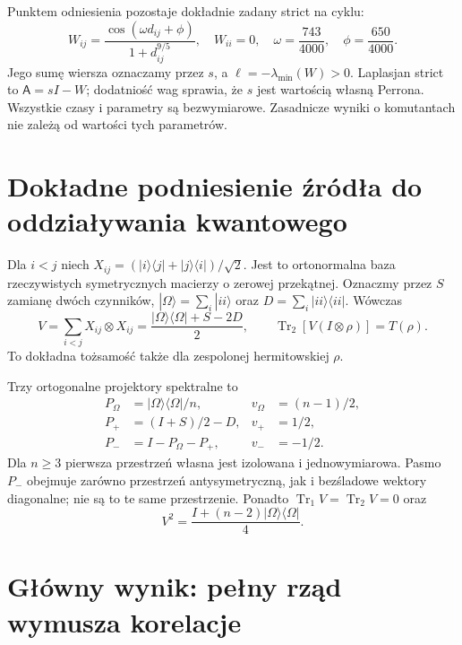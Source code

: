 \documentclass[11pt,a4paper]{article}
\newcommand{\Tr}{\operatorname{Tr}}
\begin{document}
Punktem odniesienia pozostaje dokładnie zadany strict na cyklu:
\begin{equation}\label{eq:strict}
 W_{ij}=\frac{\cos(\omega d_{ij}+\phi)}{1+d_{ij}^{9/5}},\quad
 W_{ii}=0,\quad \omega=\frac{743}{4000},\quad\phi=\frac{650}{4000}.
\end{equation}
Jego sumę wiersza oznaczamy przez $s$, a $\ell=-\lambda_{\min}(W)>0$.
Laplasjan strict to $\mathsf A=sI-W$; dodatniość wag sprawia, że
$s$ jest wartością własną Perrona.
Wszystkie czasy i parametry są bezwymiarowe. Zasadnicze wyniki
o komutantach nie zależą od wartości tych parametrów.

\section{Dokładne podniesienie źródła do oddziaływania kwantowego}

Dla $i<j$ niech $X_{ij}=(|i\rangle\langle j|+|j\rangle\langle i|)/\sqrt2$.
Jest to ortonormalna baza rzeczywistych symetrycznych macierzy
o zerowej przekątnej. Oznaczmy przez $S$ zamianę dwóch czynników,
$|\Omega\rangle=\sum_i|ii\rangle$ oraz $D=\sum_i|ii\rangle\langle ii|$.
Wówczas
\begin{equation}\label{eq:V}
 V=\sum_{i<j}X_{ij}\otimes X_{ij}
   =\frac{|\Omega\rangle\langle\Omega|+S-2D}{2},\qquad
 \Tr_2[V(I\otimes\rho)]=T(\rho).
\end{equation}
To dokładna tożsamość także dla zespolonej hermitowskiej $\rho$.

Trzy ortogonalne projektory spektralne to
\begin{align}
 P_\Omega&=|\Omega\rangle\langle\Omega|/n,&v_\Omega&=(n-1)/2,\\
 P_+&=(I+S)/2-D,&v_+&=1/2,\\
 P_-&=I-P_\Omega-P_+,&v_-&=-1/2.
\end{align}
Dla $n\ge3$ pierwsza przestrzeń własna jest izolowana i jednowymiarowa.
Pasmo $P_-$ obejmuje zarówno przestrzeń antysymetryczną, jak i
bezśladowe wektory diagonalne; nie są to te same przestrzenie.
Ponadto $\Tr_1V=\Tr_2V=0$ oraz
\begin{equation}\label{eq:V2}
 V^2=\frac{I+(n-2)|\Omega\rangle\langle\Omega|}{4}.
\end{equation}

\section{Główny wynik: pełny rząd wymusza korelacje}
\end{document}
